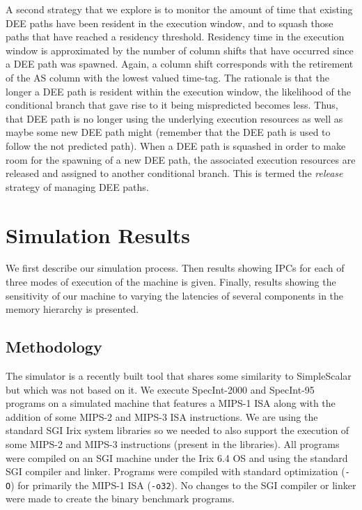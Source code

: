 \documentclass[10pt,dvips]{article}
\begin{document}
A second strategy that we explore is to monitor
the amount of time that existing DEE paths have been
resident in the execution window, and to squash those paths that
have reached a residency threshold.  Residency time in the
execution window is approximated by the number of column shifts that
have occurred since a DEE path was spawned.  
Again, a column
shift corresponds with the retirement of the AS column with the
lowest valued time-tag.
The rationale is that the longer a DEE path is resident
within the execution window,
the likelihood of the conditional branch that gave rise to it being 
mispredicted becomes less.  
Thus, that DEE path is no longer using the
underlying execution resources as well as maybe some new DEE
path might (remember that the DEE path is used to follow the not predicted
path).
When a DEE path is 
squashed in order to make room for
the spawning of a new DEE path, the associated
execution resources are released and assigned to another conditional
branch.
This is termed the \textit{release} strategy of managing
DEE paths.
%
%
\section{Simulation Results}
%
We first describe our simulation process.
Then results showing IPCs for each of three
modes of execution of the machine is given.
Finally, results showing the sensitivity of our machine
to varying the latencies of several components in the memory hierarchy
is presented.
%
%
\subsection{Methodology}
%
The simulator is a recently built tool that shares some similarity
to SimpleScalar \cite{Austin97} but which was not based on it.
We execute
SpecInt-2000 and SpecInt-95 programs on a simulated machine
that features a MIPS-1 ISA along with the addition of some MIPS-2 and
MIPS-3 ISA instructions.  We are using the standard SGI Irix system
libraries so we needed to also support the execution of some
MIPS-2 and MIPS-3 instructions (present in the libraries).
All programs were compiled on an SGI machine under the
Irix 6.4 OS and using the standard SGI compiler and linker.  
Programs were compiled with
standard optimization ({\tt -O}) for primarily the MIPS-1 ISA ({\tt -o32}).
No changes to the SGI compiler or linker were made to create
the binary benchmark programs.
\end{document}
